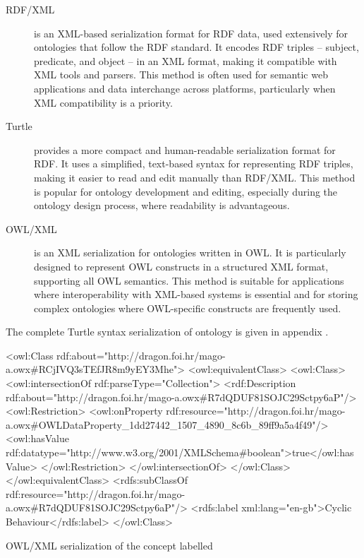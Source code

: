 \begin{description}
    \item[RDF/XML]  
    is an XML-based serialization format for \ac{RDF} data, used extensively for ontologies that follow the RDF standard. It encodes \ac{RDF} triples -- subject, predicate, and object -- in an \ac{XML} format, making it compatible with XML tools and parsers. This method is often used for semantic web applications and data interchange across platforms, particularly when XML compatibility is a priority.

    \item [Turtle]
    provides a more compact and human-readable serialization format for \ac{RDF}. It uses a simplified, text-based syntax for representing RDF triples,
    making it easier to read and edit manually than RDF/XML. This method is popular for ontology development and editing, especially during the ontology design process, where readability is advantageous.

    \item [OWL/XML]
    is an \ac{XML} serialization for ontologies written in \ac{OWL}. It is particularly designed to represent \ac{OWL} constructs in a structured XML format,
    supporting all \ac{OWL} semantics. This method is suitable for applications where interoperability with XML-based systems is essential and for storing complex ontologies where OWL-specific constructs are frequently used.
\end{description}

The complete Turtle syntax serialization of \magoontologyname ontology is given in appendix .

\begin{listing}
    \begin{mintedXML}
    <owl:Class rdf:about="http://dragon.foi.hr/mago-a.owx#RCjIVQ3sTEfJR8m9yEY3Mhe">
        <owl:equivalentClass>
            <owl:Class>
                <owl:intersectionOf rdf:parseType="Collection">
                    <rdf:Description rdf:about="http://dragon.foi.hr/mago-a.owx#R7dQDUF81SOJC29Sctpy6aP"/>
                    <owl:Restriction>
                        <owl:onProperty rdf:resource="http://dragon.foi.hr/mago-a.owx#OWLDataProperty_1dd27442_1507_4890_8c6b_89ff9a5a4f49"/>
                        <owl:hasValue rdf:datatype="http://www.w3.org/2001/XMLSchema#boolean">true</owl:hasValue>
                    </owl:Restriction>
                </owl:intersectionOf>
            </owl:Class>
        </owl:equivalentClass>
        <rdfs:subClassOf rdf:resource="http://dragon.foi.hr/mago-a.owx#R7dQDUF81SOJC29Sctpy6aP"/>
        <rdfs:label xml:lang="en-gb">Cyclic Behaviour</rdfs:label>
    </owl:Class>
    \end{mintedXML}
    \caption{OWL/XML serialization of the concept labelled }
    \label{lst: owl-xml serialization cyclic behaviour}
\end{listing}

